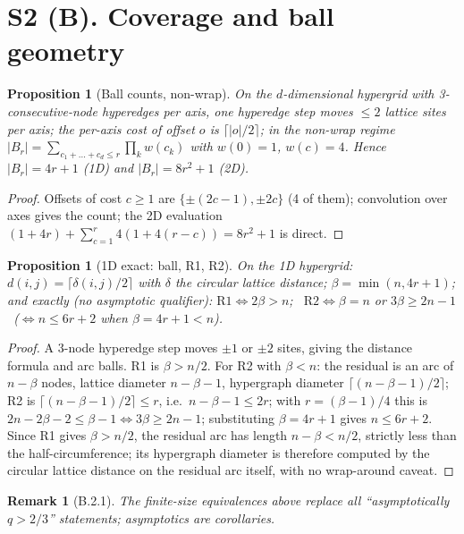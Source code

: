 \documentclass[preprint,12pt]{elsarticle}
\newtheorem{proposition}[theorem]{Proposition}
\newtheorem{remark}{Remark}[theorem]
\begin{document}
\section{S2 (B). Coverage and ball geometry}
\label{sec:B}

\begin{proposition}[Ball counts, non-wrap]
\label{prop:B1}
On the $d$-dimensional hypergrid with 3-consecutive-node hyperedges per
axis, one hyperedge step moves $\le2$ lattice sites per axis; the
per-axis cost of offset $o$ is $\lceil|o|/2\rceil$; in the non-wrap
regime $|B_r|=\sum_{c_1+\dots+c_d\le r}\prod_k w(c_k)$ with $w(0)=1$,
$w(c)=4$. Hence $|B_r|=4r+1$ (1D) and $|B_r|=8r^2+1$ (2D).
\end{proposition}
\begin{proof}
Offsets of cost $c\ge1$ are $\{\pm(2c-1),\pm2c\}$ (4 of them);
convolution over axes gives the count; the 2D evaluation
$(1+4r)+\sum_{c=1}^{r}4(1+4(r-c))=8r^2+1$ is direct.
\end{proof}

\begin{proposition}[1D exact: ball, R1, R2]
\label{prop:B2}
On the 1D hypergrid: $d(i,j)=\lceil\delta(i,j)/2\rceil$ with $\delta$
the circular lattice distance; $\beta=\min(n,4r+1)$; and exactly (no
asymptotic qualifier):
$\mathrm{R1}\iff 2\beta>n$; \ $\mathrm{R2}\iff \beta=n$ or
$3\beta\ge2n-1$ \ ($\iff n\le6r+2$ when $\beta=4r+1<n$).
\end{proposition}
\begin{proof}
A 3-node hyperedge step moves $\pm1$ or $\pm2$ sites, giving the distance
formula and arc balls. R1 is $\beta>n/2$. For R2 with $\beta<n$: the
residual is an arc of $n-\beta$ nodes, lattice diameter $n-\beta-1$,
hypergraph diameter $\lceil(n-\beta-1)/2\rceil$; R2 is
$\lceil(n-\beta-1)/2\rceil\le r$, i.e.\ $n-\beta-1\le2r$; with
$r=(\beta-1)/4$ this is $2n-2\beta-2\le\beta-1\iff3\beta\ge2n-1$;
substituting $\beta=4r+1$ gives $n\le6r+2$. Since R1 gives $\beta>n/2$, the residual arc has length $n-\beta<n/2$,
strictly less than the half-circumference; its hypergraph diameter is
therefore computed by the circular lattice distance on the residual arc
itself, with no wrap-around caveat.
\end{proof}
\begin{remark}[B.2.1]
\label{rem:B2.1}
The finite-size equivalences above replace all ``asymptotically
$q>2/3$'' statements; asymptotics are corollaries.
\end{remark}
\end{document}
